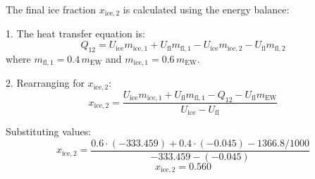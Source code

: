 The final ice fraction \( x_{\text{ice},2} \) is calculated using the energy balance:  

1. The heat transfer equation is:  
\[
Q_{12} = U_{\text{ice}} m_{\text{ice},1} + U_{\text{fl}} m_{\text{fl},1} - U_{\text{ice}} m_{\text{ice},2} - U_{\text{fl}} m_{\text{fl},2}
\]  
where \( m_{\text{fl},1} = 0.4 \, m_{\text{EW}} \) and \( m_{\text{ice},1} = 0.6 \, m_{\text{EW}} \).  

2. Rearranging for \( x_{\text{ice},2} \):  
\[
x_{\text{ice},2} = \frac{U_{\text{ice}} m_{\text{ice},1} + U_{\text{fl}} m_{\text{fl},1} - Q_{12} - U_{\text{fl}} m_{\text{EW}}}{U_{\text{ice}} - U_{\text{fl}}}
\]  

Substituting values:  
\[
x_{\text{ice},2} = \frac{0.6 \cdot (-333.459) + 0.4 \cdot (-0.045) - 1366.8 / 1000}{-333.459 - (-0.045)}
\]  
\[
x_{\text{ice},2} = 0.560
\]
